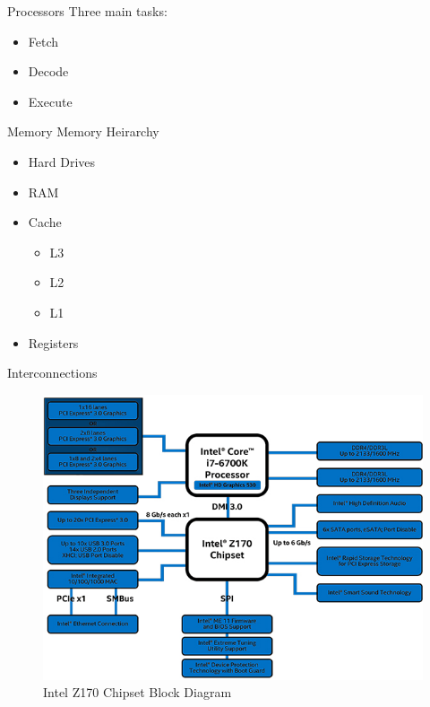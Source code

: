 \documentclass[serif,mathserif,compress]{beamer}
\begin{document}
\begin{frame}{Processors}
  Three main tasks:
  \begin{itemize}
  \item<1-> Fetch 
  \item<1-> Decode 
  \item<1-> Execute 
  \end{itemize}
\end{frame}

\begin{frame}{Memory}
  Memory Heirarchy
  \begin{itemize}
  \item<1-> Hard Drives 
  \item<3-> RAM 
  \item<5-> Cache 
    \begin{itemize}
    \item<7-> L3 
    \item<7-> L2 
    \item<7-> L1 
    \end{itemize}
  \item<9-> Registers
  \end{itemize}
\end{frame}

\begin{frame}{Interconnections}
  \begin{figure}
  \centering
  \includegraphics[height=0.65\textheight]{images/Intel-Z170-chipset-block-diagram.jpg}
  \caption{Intel Z170 Chipset Block Diagram}
  \label{fig:intel-z170-chipset}
  \end{figure}
\end{frame}
\end{document}
